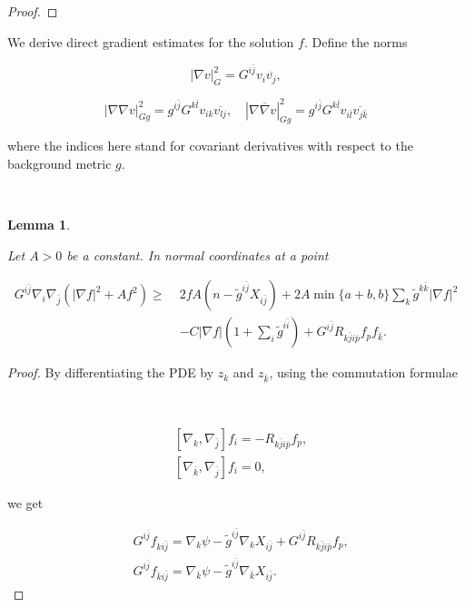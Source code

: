 \documentclass[11pt,letterpaper]{amsart}
\newcommand{\bi}{\bar{i}}
\newcommand{\bj}{\bar{j}}
\newcommand{\bk}{\bar{k}}
\newcommand{\bl}{\bar{l}}
\newcommand{\bp}{\bar{p}}
\newcommand{\bnabla}{\overline{\nabla}}
\newcommand{\ol}{\overline}
\newtheorem{lemma}[theorem]{Lemma}
\numberwithin{equation}{section}
\begin{document}
\begin{itemize}
\begin{proof}
\end{proof}

We derive direct gradient estimates for the solution $f$. Define the norms 

$$|\nabla v|_{G}^2 = G^{i \bj} v_{i} \ol{v_{j}},$$

$$|\nabla \nabla v|_{Gg}^2 = g^{i \bj}G^{k \bl} v_{ik} \ol{v_{lj}}, \quad |\nabla \bnabla v|_{Gg}^2 = g^{i \bj}G^{k \bl} v_{i\bl} \ol{v_{j \bk}}$$


\noindent where the indices here stand for covariant derivatives with respect to the background metric $g$. 

\


\begin{lemma}\label{lemma2}


Let $A>0$ be a constant.
 In normal coordinates at a point

    \begin{equation*}
        \begin{aligned}
            G^{i \bj} \nabla_i \nabla_{\bj} (|\nabla f|^2 + A f^2) \geq \;  & 2 f A(n- \tilde g^{i \bj} X_{i\bj}) +2 A\min\{a+b, b\}\sum_k \tilde g^{k \bk}  |\nabla f|^2 \\
            &- C|\nabla f|(1+\sum_i \tilde g^{i \bi})+G^{i \bj }R_{k \bj i \bp} f_p f_{\bk} .
        \end{aligned}
    \end{equation*}
    
\end{lemma}

\begin{proof}

By differentiating the PDE by $z_k$ and $z_{\bk}$, using the commutation formulae

\

$$
\begin{aligned}
   &[\nabla_k, \nabla_{\bj}] f_i = -R_{k \bj i \bp} f_p,\\
   &[\nabla_\bk, \nabla_{\bj}] f_i = 0, 
\end{aligned}
$$

\noindent we get

\begin{equation}\label{g-1}
    \begin{aligned}
        &G^{i \bj} f_{k i \bj} = \nabla_k \psi - \tilde g^{i \bj}  \nabla_{k} X_{i \bj} + G^{i \bj }R_{k \bj i \bp} f_p,\\
        &G^{i \bj}  f_{\bk i \bj} = \nabla_{\bk} \psi - \tilde g^{i \bj} \nabla_{\bk} X_{i \bj}.
    \end{aligned}
\end{equation}


\end{proof}
\end{itemize}
\end{document}
